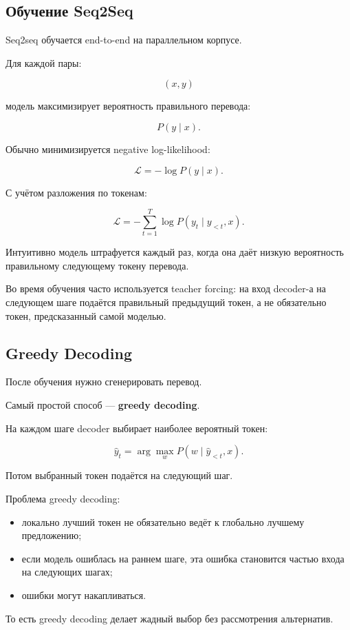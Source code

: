 \documentclass[a4paper,12pt]{article}
\begin{document}
\subsection{Обучение Seq2Seq}

Seq2seq обучается end-to-end на параллельном корпусе.

Для каждой пары:

\[
(x, y)
\]

модель максимизирует вероятность правильного перевода:

\[
P(y \mid x).
\]

Обычно минимизируется negative log-likelihood:

\[
\mathcal{L}
=
-\log P(y \mid x).
\]

С учётом разложения по токенам:

\[
\mathcal{L}
=
-
\sum_{t=1}^{T}
\log P(y_t \mid y_{<t}, x).
\]

Интуитивно модель штрафуется каждый раз, когда она даёт низкую вероятность правильному следующему токену перевода.

Во время обучения часто используется teacher forcing: на вход decoder-а на следующем шаге подаётся правильный предыдущий токен, а не обязательно токен, предсказанный самой моделью.

\subsection{Greedy Decoding}

После обучения нужно сгенерировать перевод.

Самый простой способ --- \textbf{greedy decoding}.

На каждом шаге decoder выбирает наиболее вероятный токен:

\[
\hat{y}_t
=
\arg\max_{w}
P(w \mid \hat{y}_{<t}, x).
\]

Потом выбранный токен подаётся на следующий шаг.

Проблема greedy decoding:

\begin{itemize}
    \item локально лучший токен не обязательно ведёт к глобально лучшему предложению;
    \item если модель ошиблась на раннем шаге, эта ошибка становится частью входа на следующих шагах;
    \item ошибки могут накапливаться.
\end{itemize}

То есть greedy decoding делает жадный выбор без рассмотрения альтернатив.
\end{document}
